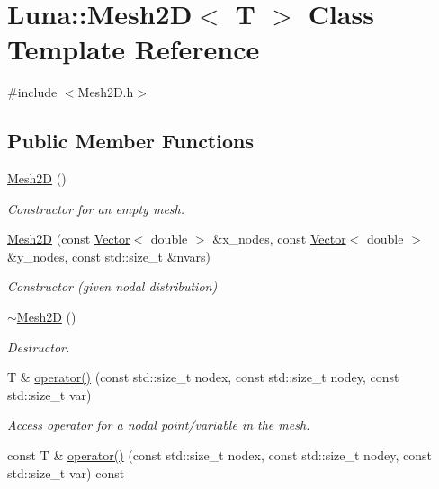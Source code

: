 \hypertarget{classLuna_1_1Mesh2D}{}\section{Luna\+:\+:Mesh2D$<$ T $>$ Class Template Reference}
\label{classLuna_1_1Mesh2D}


{\ttfamily \#include $<$Mesh2\+D.\+h$>$}

\subsection*{Public Member Functions}
\begin{DoxyCompactItemize}
\item 
\hyperlink{classLuna_1_1Mesh2D_a867e2acbb4c6c23faf04ee6bacd2c300}{Mesh2D} ()
\begin{DoxyCompactList}\small\item\em Constructor for an empty mesh. \end{DoxyCompactList}\item 
\hyperlink{classLuna_1_1Mesh2D_ae0b525b986a67e18b0c413d304b011c1}{Mesh2D} (const \hyperlink{classLuna_1_1Vector}{Vector}$<$ double $>$ \&x\+\_\+nodes, const \hyperlink{classLuna_1_1Vector}{Vector}$<$ double $>$ \&y\+\_\+nodes, const std\+::size\+\_\+t \&nvars)
\begin{DoxyCompactList}\small\item\em Constructor (given nodal distribution) \end{DoxyCompactList}\item 
\hyperlink{classLuna_1_1Mesh2D_a093b69eaccb8e9df54f3613a2f1027c0}{$\sim$\+Mesh2D} ()
\begin{DoxyCompactList}\small\item\em Destructor. \end{DoxyCompactList}\item 
T \& \hyperlink{classLuna_1_1Mesh2D_ac12d7998f2cea2daeef921e738337a38}{operator()} (const std\+::size\+\_\+t nodex, const std\+::size\+\_\+t nodey, const std\+::size\+\_\+t var)
\begin{DoxyCompactList}\small\item\em Access operator for a nodal point/variable in the mesh. \end{DoxyCompactList}\item 
const T \& \hyperlink{classLuna_1_1Mesh2D_aff8f62c9cc1c67b973f9d3531bb94e9b}{operator()} (const std\+::size\+\_\+t nodex, const std\+::size\+\_\+t nodey, const std\+::size\+\_\+t var) const

\end{DoxyCompactItemize}
